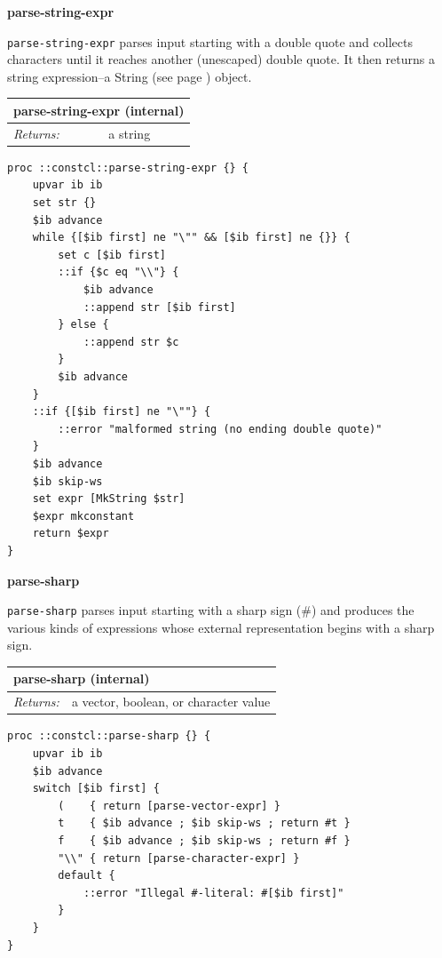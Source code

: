 \documentclass[twoside,9pt]{report}
\begin{document}
\textbf{parse-string-expr}


\texttt{parse-string-expr} parses input starting with a double quote and collects characters until it reaches another (unescaped) double quote. It then returns a string expression--a String (see page \pageref{strings}) object.

\begin{tabular}{ |l l| }
\hline
\multicolumn{2}{|l|}{parse-string-expr (internal)} \\
\hline
\textit{Returns:} & a string \\
\hline
\end{tabular}

\noindent\makebox[\linewidth]{\rule{\linewidth}{0.4pt}}
\begin{lstlisting}
proc ::constcl::parse-string-expr {} {
    upvar ib ib
    set str {}
    $ib advance
    while {[$ib first] ne "\"" && [$ib first] ne {}} {
        set c [$ib first]
        ::if {$c eq "\\"} {
            $ib advance
            ::append str [$ib first]
        } else {
            ::append str $c
        }
        $ib advance
    }
    ::if {[$ib first] ne "\""} {
        ::error "malformed string (no ending double quote)"
    }
    $ib advance
    $ib skip-ws
    set expr [MkString $str]
    $expr mkconstant
    return $expr
}
\end{lstlisting}
\noindent\makebox[\linewidth]{\rule{\linewidth}{0.4pt}}

\textbf{parse-sharp}


\texttt{parse-sharp} parses input starting with a sharp sign (\#) and produces the various kinds of expressions whose external representation begins with a sharp sign.

\begin{tabular}{ |l l| }
\hline
\multicolumn{2}{|l|}{parse-sharp (internal)} \\
\hline
\textit{Returns:} & a vector, boolean, or character value \\
\hline
\end{tabular}

\noindent\makebox[\linewidth]{\rule{\linewidth}{0.4pt}}
\begin{lstlisting}
proc ::constcl::parse-sharp {} {
    upvar ib ib
    $ib advance
    switch [$ib first] {
        (    { return [parse-vector-expr] }
        t    { $ib advance ; $ib skip-ws ; return #t }
        f    { $ib advance ; $ib skip-ws ; return #f }
        "\\" { return [parse-character-expr] }
        default {
            ::error "Illegal #-literal: #[$ib first]"
        }
    }
}
\end{lstlisting}
\noindent\makebox[\linewidth]{\rule{\linewidth}{0.4pt}}
\end{document}
